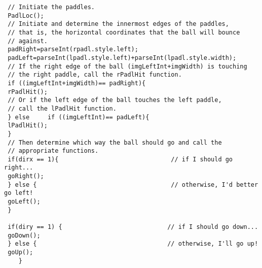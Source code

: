\documentclass[a4paper,10pt]{article}
\begin{document}
\begin{verbatim}
 // Initiate the paddles.
 PadlLoc();
 // Initiate and determine the innermost edges of the paddles,
 // that is, the horizontal coordinates that the ball will bounce
 // against.
 padRight=parseInt(rpadl.style.left);
 padLeft=parseInt(lpadl.style.left)+parseInt(lpadl.style.width);
 // If the right edge of the ball (imgLeftInt+imgWidth) is touching
 // the right paddle, call the rPadlHit function.
 if ((imgLeftInt+imgWidth)== padRight){
 rPadlHit();
 // Or if the left edge of the ball touches the left paddle,
 // call the lPadlHit function.
 } else     if ((imgLeftInt)== padLeft){
 lPadlHit();
 }
 // Then determine which way the ball should go and call the
 // appropriate functions.
 if(dirx == 1){                               // if I should go right...
 goRight();
 } else {                                     // otherwise, I'd better go left!
 goLeft();
 }

 if(diry == 1) {                             // if I should go down...
 goDown();
 } else {                                    // otherwise, I'll go up!
 goUp();
    }


\end{verbatim}
\end{document}
